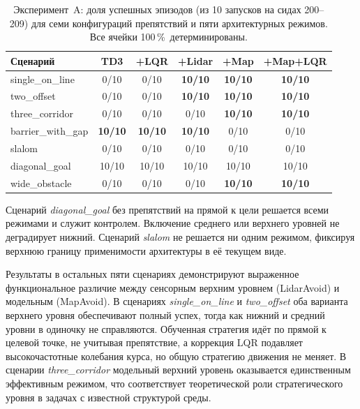 \documentclass[11pt]{article}
\begin{document}
\begin{table}[h]
\begin{center}
\begin{tabular}{lccccc}
\toprule
Сценарий & TD3 & +LQR & +Lidar & +Map & +Map+LQR \\
\midrule
single\_on\_line     & 0/10 & 0/10 & \textbf{10/10} & \textbf{10/10} & \textbf{10/10} \\
two\_offset         & 0/10 & 0/10 & \textbf{10/10} & \textbf{10/10} & \textbf{10/10} \\
three\_corridor     & 0/10 & 0/10 & 0/10           & \textbf{10/10} & \textbf{10/10} \\
barrier\_with\_gap  & \textbf{10/10} & \textbf{10/10} & \textbf{10/10} & 0/10 & 0/10 \\
slalom              & 0/10 & 0/10 & 0/10 & 0/10           & 0/10           \\
diagonal\_goal      & 10/10 & 10/10 & 10/10 & 10/10        & 10/10         \\
wide\_obstacle      & 0/10 & 0/10 & 0/10 & \textbf{10/10} & \textbf{10/10} \\
\bottomrule
\end{tabular}
\caption{Эксперимент~A: доля успешных эпизодов (из 10 запусков на сидах
200--209) для семи конфигураций препятствий и пяти архитектурных режимов.
Все ячейки 100\,\%~детерминированы.}
\label{tab:exp_a}
\end{center}
\end{table}

Сценарий \emph{diagonal\_goal} без препятствий на прямой к цели решается
всеми режимами и служит контролем. Включение среднего или верхнего уровней не деградирует нижний. Сценарий \emph{slalom}
не решается ни одним режимом, фиксируя верхнюю границу применимости
архитектуры в её текущем виде.

Результаты в остальных пяти сценариях демонстрируют выраженное функциональное различие между сенсорным верхним уровнем (LidarAvoid) и модельным (MapAvoid). В сценариях \emph{single\_on\_line} и
\emph{two\_offset} оба варианта верхнего уровня обеспечивают полный успех,
тогда как нижний и средний уровни в одиночку не справляются.
Обученная стратегия идёт по прямой к целевой точке, не учитывая
препятствие, а коррекция LQR подавляет высокочастотные колебания
курса, но общую стратегию движения не меняет. В сценарии \emph{three\_corridor} модельный верхний уровень оказывается единственным эффективным режимом, что соответствует теоретической роли стратегического уровня в задачах с известной структурой среды.
\end{document}
